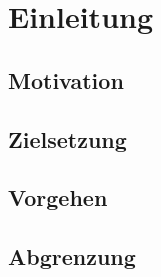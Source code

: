 \chapter{Einleitung}

\section{Motivation}

\section{Zielsetzung}

\section{Vorgehen}

\section{Abgrenzung}